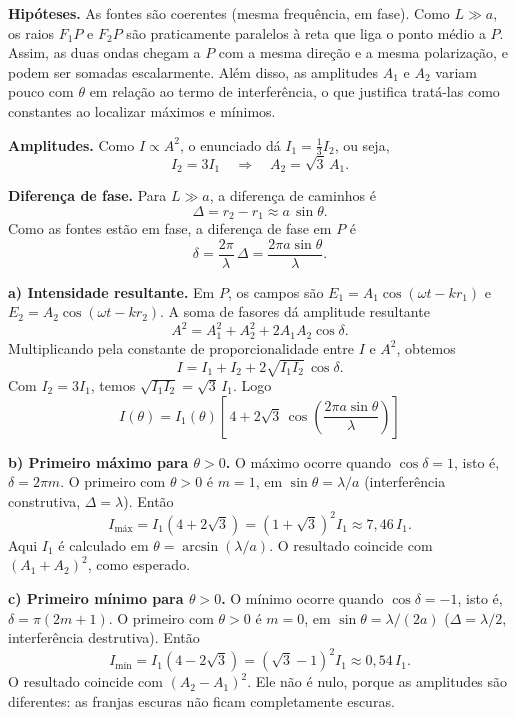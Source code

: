 \documentclass{article}%
\begin{document}
\textbf{Hipóteses.} As fontes são coerentes (mesma frequência, em fase). Como $L\gg a$, os raios $F_1P$ e $F_2P$ são praticamente paralelos à reta que liga o ponto médio a $P$. Assim, as duas ondas chegam a $P$ com a mesma direção e a mesma polarização, e podem ser somadas escalarmente. Além disso, as amplitudes $A_1$ e $A_2$ variam pouco com $\theta$ em relação ao termo de interferência, o que justifica tratá-las como constantes ao localizar máximos e mínimos.

\textbf{Amplitudes.} Como $I\propto A^2$, o enunciado dá $I_1=\tfrac13 I_2$, ou seja,
\[
I_2 = 3I_1 \quad\Rightarrow\quad A_2=\sqrt{3}\,A_1 .
\]

\textbf{Diferença de fase.} Para $L\gg a$, a diferença de caminhos é
\[
\Delta = r_2-r_1 \approx a\,\sin\theta .
\]
Como as fontes estão em fase, a diferença de fase em $P$ é
\[
\delta = \frac{2\pi}{\lambda}\,\Delta=\frac{2\pi a\sin\theta}{\lambda}.
\]

\textbf{a) Intensidade resultante.} Em $P$, os campos são $E_1=A_1\cos(\omega t-kr_1)$ e $E_2=A_2\cos(\omega t-kr_2)$. A soma de fasores dá amplitude resultante
\[
A^2 = A_1^2 + A_2^2 + 2A_1A_2\cos\delta .
\]
Multiplicando pela constante de proporcionalidade entre $I$ e $A^2$, obtemos
\[
I = I_1 + I_2 + 2\sqrt{I_1I_2}\,\cos\delta .
\]
Com $I_2=3I_1$, temos $\sqrt{I_1I_2}=\sqrt{3}\,I_1$. Logo
\[
\boxed{\,I(\theta)=I_1(\theta)\left[\,4+2\sqrt{3}\,\cos\!\left(\frac{2\pi a\sin\theta}{\lambda}\right)\right]\,}
\]

\textbf{b) Primeiro máximo para $\theta>0$.} O máximo ocorre quando $\cos\delta=1$, isto é, $\delta=2\pi m$. O primeiro com $\theta>0$ é $m=1$, em $\sin\theta=\lambda/a$ (interferência construtiva, $\Delta=\lambda$). Então
\[
I_{\text{máx}} = I_1\left(4+2\sqrt3\right)=\left(1+\sqrt3\right)^2 I_1 \approx 7{,}46\,I_1 .
\]
Aqui $I_1$ é calculado em $\theta=\arcsin(\lambda/a)$. O resultado coincide com $(A_1+A_2)^2$, como esperado.

\textbf{c) Primeiro mínimo para $\theta>0$.} O mínimo ocorre quando $\cos\delta=-1$, isto é, $\delta=\pi(2m+1)$. O primeiro com $\theta>0$ é $m=0$, em $\sin\theta=\lambda/(2a)$ ($\Delta=\lambda/2$, interferência destrutiva). Então
\[
I_{\text{mín}} = I_1\left(4-2\sqrt3\right)=\left(\sqrt3-1\right)^2 I_1 \approx 0{,}54\,I_1 .
\]
O resultado coincide com $(A_2-A_1)^2$. Ele não é nulo, porque as amplitudes são diferentes: as franjas escuras não ficam completamente escuras.
\end{document}
